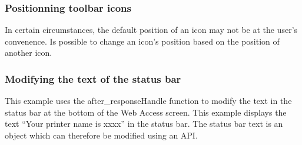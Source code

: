 \documentclass[letterpaper,10pt,english]{sphinxmanual}
\begin{document}
\subsubsection{Positionning toolbar icons}
\label{\detokenize{User_Guide:positionning-toolbar-icons}}
In certain circumstances, the default position of an icon may not be at the user’s convenence. Is possible to change an icon’s position based on the position of another icon.

\begin{sphinxVerbatim}[commandchars=\\\{\}]
       
         
         
    
  
  
  
  
  
  
    
   
\end{sphinxVerbatim}



\subsubsection{Modifying the text of the status bar}
\label{\detokenize{User_Guide:modifying-the-text-of-the-status-bar}}
This example uses the after\_responseHandle function to modify the text in the status bar at the bottom of the Web Access screen. This example displays the text “Your printer name is xxxx” in the status bar.
The status bar text is an object which can therefore be modified using an API.
\end{document}
